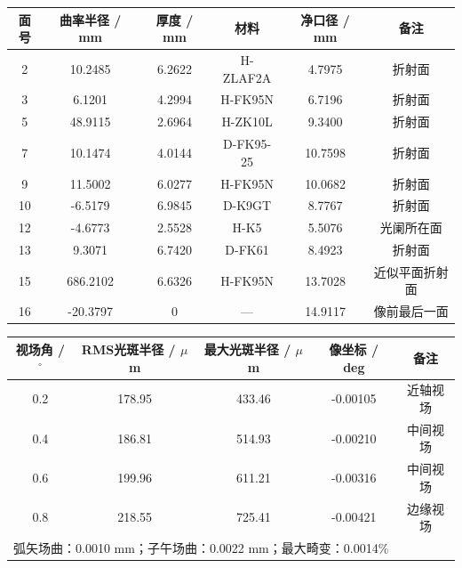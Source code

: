 \begin{table}[htbp]
    \centering
    \label{tab:obj_prescription}
    \begin{tabular}{cccccc}
        \toprule
        面号 & 曲率半径 / mm & 厚度 / mm & 材料 & 净口径 / mm & 备注 \\
        \midrule
        2  & 10.2485  & 6.2622 & H-ZLAF2A & 4.7975  & 折射面 \\
        3  & 6.1201   & 4.2994 & H-FK95N  & 6.7196  & 折射面 \\
        5  & 48.9115  & 2.6964 & H-ZK10L  & 9.3400  & 折射面 \\
        7  & 10.1474  & 4.0144 & D-FK95-25 & 10.7598 & 折射面 \\
        9  & 11.5002  & 6.0277 & H-FK95N  & 10.0682 & 折射面 \\
        10 & -6.5179  & 6.9845 & D-K9GT   & 8.7767  & 折射面 \\
        12 & -4.6773  & 2.5528 & H-K5     & 5.5076  & 光阑所在面 \\
        13 & 9.3071   & 6.7420 & D-FK61   & 8.4923  & 折射面 \\
        15 & 686.2102 & 6.6326 & H-FK95N  & 13.7028 & 近似平面折射面 \\
        16 & -20.3797 & 0       & ---      & 14.9117 & 像前最后一面 \\
        \bottomrule
    \end{tabular}
\end{table}


\begin{table}[htbp]
    \centering
    \label{tab:obj_performance}
    \begin{tabular}{ccccc}
        \toprule
        视场角 / $^\circ$ & RMS光斑半径 / $\mu$m & 最大光斑半径 / $\mu$m & 像坐标 / deg & 备注 \\
        \midrule
        0.2 & 178.95 & 433.46 & -0.00105 & 近轴视场 \\
        0.4 & 186.81 & 514.93 & -0.00210 & 中间视场 \\
        0.6 & 199.96 & 611.21 & -0.00316 & 中间视场 \\
        0.8 & 218.55 & 725.41 & -0.00421 & 边缘视场 \\
        \midrule
        \multicolumn{5}{l}{弧矢场曲：0.0010 mm；子午场曲：0.0022 mm；最大畸变：0.0014\%} \\
        \bottomrule
    \end{tabular}
\end{table}



